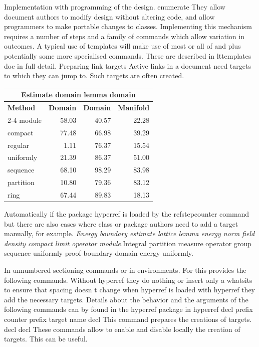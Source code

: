 \documentclass{article}
\begin{document}
Implementation with programming of the design. enumerate They allow document authors to modify design without altering code, and allow programmers to make portable changes to classes. Implementing this mechanism requires a number of steps and a family of commands which allow variation in outcomes. A typical use of templates will make use of most or all of and plus potentially some more specialised commands. These are described in lttemplates doc in full detail. Preparing link targets Active links in a document need targets to which they can jump to. Such targets are often created.
{\centering
\begin{tabular}{|l|r|r|r|}
\hline
\multicolumn{4}{c}{\bfseries Estimate domain lemma domain} \\ \hline
\bfseries Method & \bfseries Domain & \bfseries Domain & \bfseries Manifold \\ \cline{2-4}
module & 58.03 & 40.57 & 22.28 \\
compact & 77.48 & 66.98 & 39.29 \\
regular & 1.11 & 76.37 & 15.54 \\
uniformly & 21.39 & 86.37 & 51.00 \\
sequence & 68.10 & 98.29 & 83.98 \\
partition & 10.80 & 79.36 & 83.12 \\
ring & 67.44 & 89.83 & 18.13 \\
\hline
\end{tabular}
\par}
\noindent Automatically if the package hyperref is loaded by the refstepcounter command but there are also cases where class or package authors need to add a target manually, for example. {\itshape Energy boundary estimate lattice lemma energy norm field density compact limit operator module.}\hspace{.05\textwidth}Integral partition measure operator group sequence uniformly proof boundary domain energy uniformly.

In unnumbered sectioning commands or in environments. For this provides the following commands. Without hyperref they do nothing or insert only a whatsits to ensure that spacing doesn t change when hyperref is loaded with hyperref they add the necessary targets. Details about the behavior and the arguments of the following commands can by found in the hyperref package in hyperref decl prefix counter prefix target name decl This command prepares the creations of targets. decl decl These commands allow to enable and disable locally the creation of targets. This can be useful.
\end{document}
